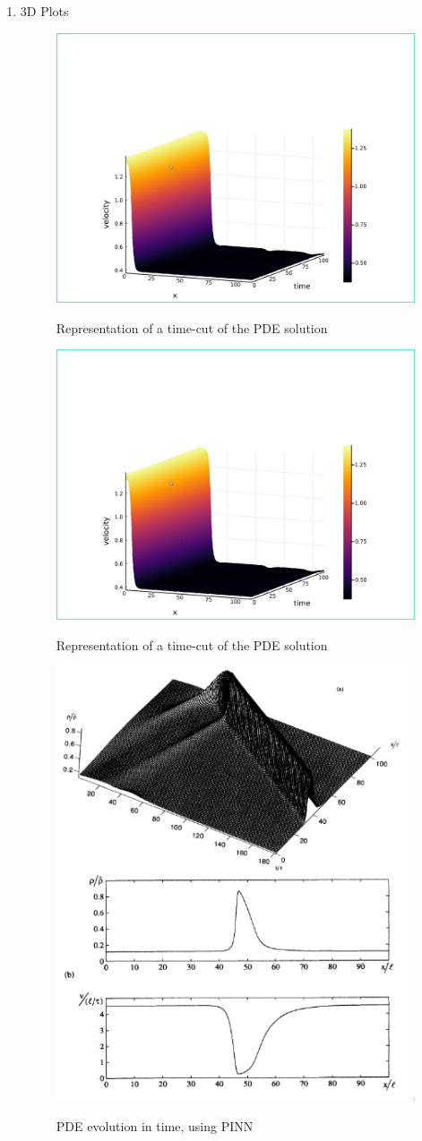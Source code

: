 \documentclass[11pt]{article}
\begin{document}
\begin{enumerate}
\item 3D Plots
\label{sec:org671aac5}

\begin{figure}[!htb]
  \centering
  \caption{\label{fig:sim3} Representation of a time-cut of the PDE solution}
  \includegraphics[width=0.45\linewidth]{Resources/img/Kerner-3d-1.jpeg}
  \\ 
\end{figure}
\clearpage

\begin{figure}[!htb]
  \centering
  \caption{\label{fig:sim3} Representation of a time-cut of the PDE solution}
  \includegraphics[width=0.45\linewidth]{Resources/img/Kerner-3d-1.jpeg}
  \\ 
\end{figure}
\clearpage

\begin{figure}[!htb]
  \centering
  \caption{\label{fig:sim4} PDE evolution in time, using PINN}
  \includegraphics[width=0.4\linewidth]{Resources/img/kerner.png}
  \\ 
\end{figure}
\end{enumerate}
\end{document}
